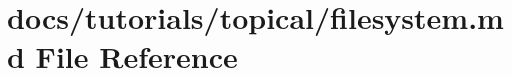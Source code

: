 \hypertarget{filesystem_8md}{}\section{docs/tutorials/topical/filesystem.md File Reference}
\label{filesystem_8md}
